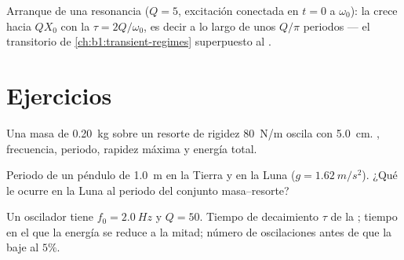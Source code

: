 \begin{omfigure}

{\small Arranque de una resonancia ($Q = 5$, excitación conectada en
$t = 0$ a $\omega_0$): la  crece hacia $QX_0$ con la  $\tau = 2Q/\omega_0$, es decir a lo largo de unos $Q/\pi$ periodos
--- el transitorio de \cref{ch:b1:transient-regimes} superpuesto al
.}
\end{omfigure}

\section{Ejercicios}

\begin{exercise}[$\star$]\label{exo:b1:oscillators-resonance:1}
Una masa de \qty{0.20}{kg} sobre un resorte de rigidez \qty{80}{N/m}
oscila con  \qty{5.0}{cm}. , frecuencia,
periodo, rapidez máxima y energía total.
\end{exercise}

\begin{exercise}[$\star$]\label{exo:b1:oscillators-resonance:2}
Periodo de un péndulo de \qty{1.0}{m} en la Tierra y en la Luna
($g = \qty{1.62}{m/s^2}$). ¿Qué le ocurre en la Luna al periodo del
conjunto masa--resorte?
\end{exercise}

\begin{exercise}[$\star$]\label{exo:b1:oscillators-resonance:3}
Un oscilador tiene $f_0 = \qty{2.0}{Hz}$ y $Q = 50$. Tiempo de
decaimiento $\tau$ de la ; tiempo en el que la energía se reduce a
la mitad; número de oscilaciones antes de que la  baje al $5\%$.
\end{exercise}

